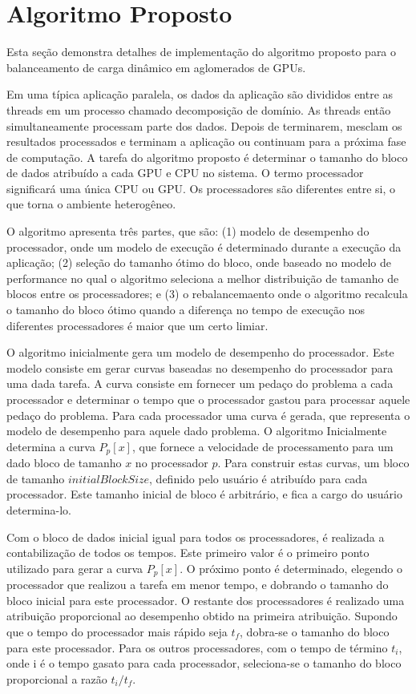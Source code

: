 \pagestyle{empty}
\cleardoublepage
\pagestyle{fancy}

\onehalfspacing

\chapter{Algoritmo Proposto}\label{cap4}

Esta seção demonstra detalhes de implementação do algoritmo proposto para o balanceamento de carga dinâmico em aglomerados de GPUs. 

Em uma típica aplicação paralela, os dados da aplicação são divididos entre as threads em um processo chamado decomposição de domínio. As threads então simultaneamente processam parte dos dados. Depois de terminarem, mesclam os resultados processados e terminam a aplicação ou continuam para a próxima fase de computação. A tarefa do algoritmo proposto é determinar o tamanho do bloco de dados atribuído a cada GPU e CPU no sistema. O termo processador significará uma única CPU ou GPU. Os processadores são diferentes entre si, o que torna o ambiente heterogêneo. 

O algoritmo apresenta três partes, que são: (1) modelo de desempenho do processador, onde um modelo de execução é determinado durante a execução da aplicação; (2) seleção do tamanho ótimo do bloco, onde baseado no modelo de performance no qual o algoritmo seleciona a melhor distribuição de tamanho de blocos entre os processadores; e (3) o rebalancemaento onde o algoritmo recalcula o tamanho do bloco ótimo quando a diferença no tempo de execução nos diferentes processadores é maior que um certo limiar.

O algoritmo inicialmente gera um modelo de desempenho do processador. Este modelo consiste em gerar curvas baseadas no desempenho do processador para uma dada tarefa. A curva consiste em fornecer um pedaço do problema a cada processador e determinar o tempo que o processador gastou para processar aquele pedaço do problema. Para cada processador uma curva é gerada, que representa o modelo de desempenho para aquele dado problema. O algoritmo Inicialmente determina a curva $P_p[x]$, que fornece a velocidade de processamento para um dado bloco de tamanho $x$ no processador $p$. Para construir estas curvas, um bloco de tamanho $initialBlockSize$, definido pelo usuário é atribuído para cada processador. Este tamanho inicial de bloco é arbitrário, e fica a cargo do usuário determina-lo.

Com o bloco de dados inicial igual para todos os processadores, é realizada a contabilização de todos os tempos. Este primeiro valor é o primeiro ponto utilizado para gerar a curva $P_p[x]$. O próximo ponto é determinado, elegendo o processador que realizou a tarefa em menor tempo, e dobrando o tamanho do bloco inicial para este processador. O restante dos processadores é realizado uma atribuição proporcional ao desempenho obtido na primeira atribuição. Supondo que o tempo do processador mais rápido seja $t_f$, dobra-se o tamanho do bloco para este processador. Para os outros processadores, com o tempo de término $t_i$, onde i é o tempo gasato para cada processador, seleciona-se o tamanho do bloco proporcional a razão $t_i/t_f$. 


